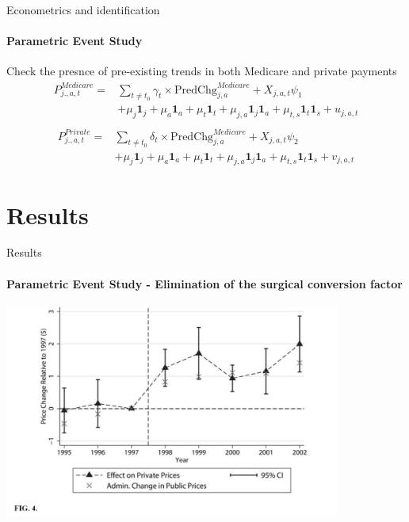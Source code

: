 \documentclass{beamer}
\begin{document}
\begin{frame}{Econometrics and identification}
\framesubtitle{Parametric Event Study}
Check the presnce of pre-existing trends in both Medicare and private payments
\begin{align*}
P^{Medicare}_{j.,a,t} = &  \sum_{t \neq t_0} \gamma_t \times \text{PredChg}_{j,a}^{Medicare}+ X_{j,a,t}\psi_{1} \\
& + \mu_j \mathbf{1}_j + \mu_a \mathbf{1}_a +  \mu_t \mathbf{1}_t + \mu_{j,a} \mathbf{1}_j\mathbf{1}_a + \mu_{t,s} \mathbf{1}_t\mathbf{1}_s + u_{j,a,t} \\
\end{align*}
\begin{align*}
P^{Private}_{j.,a,t} = &  \sum_{t \neq t_0} \delta_t \times \text{PredChg}_{j,a}^{Medicare}+ X_{j,a,t}\psi_{2} \\
& + \mu_j \mathbf{1}_j + \mu_a \mathbf{1}_a +  \mu_t \mathbf{1}_t + \mu_{j,a} \mathbf{1}_j\mathbf{1}_a + \mu_{t,s} \mathbf{1}_t\mathbf{1}_s + v_{j,a,t}
\end{align*}
\end{frame}

\section{Results}
\begin{frame}{Results}
\framesubtitle{Parametric Event Study - Elimination of the surgical conversion factor}
\begin{center}
\includegraphics[height=7cm]{fig4}
\end{center}
\end{frame}
\end{document}
